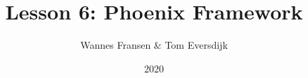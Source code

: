 \documentclass{beamer}
\title{Lesson 6: Phoenix Framework}
\author{Wannes Fransen \& Tom Eversdijk}
\institute{UC Leuven}
\date{2020}
\begin{document}
\frame{\titlepage}


% 
% 
% 
% 
\end{document}
